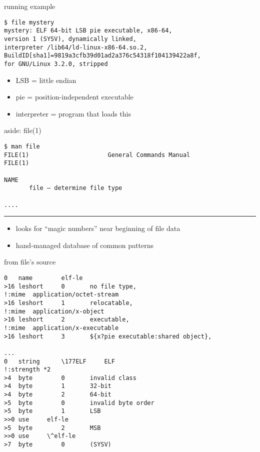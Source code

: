 \begin{frame}[fragile]{running example}
\begin{Verbatim}[fontsize=\small]
$ file mystery
mystery: ELF 64-bit LSB pie executable, x86-64,
version 1 (SYSV), dynamically linked,
interpreter /lib64/ld-linux-x86-64.so.2,
BuildID[sha1]=9819a3cfb39d01ad2a376c54318f104139422a8f,
for GNU/Linux 3.2.0, stripped
\end{Verbatim}
\begin{itemize}
\item LSB = little endian
\item pie = position-independent executable
\item interpreter = program that loads this
\end{itemize}
\end{frame}

\begin{frame}[fragile]{aside: file(1)}
\begin{Verbatim}[fontsize=\small]
$ man file
FILE(1)                      General Commands Manual                    FILE(1)

NAME
       file — determine file type

....
\end{Verbatim}
\hrule
\begin{itemize}
\item looks for ``magic numbers'' near beginning of file data
\item hand-managed database of common patterns
\end{itemize}
\end{frame}

\begin{frame}[fragile]{from file's source}
\begin{Verbatim}[fontsize=\scriptsize]
0   name        elf-le
>16 leshort     0       no file type,
!:mime  application/octet-stream
>16 leshort     1       relocatable,
!:mime  application/x-object
>16 leshort     2       executable,
!:mime  application/x-executable
>16 leshort     3       ${x?pie executable:shared object},

...
0   string      \177ELF     ELF
!:strength *2
>4  byte        0       invalid class
>4  byte        1       32-bit
>4  byte        2       64-bit
>5  byte        0       invalid byte order
>5  byte        1       LSB
>>0 use     elf-le
>5  byte        2       MSB
>>0 use     \^elf-le
>7  byte        0       (SYSV)
\end{Verbatim}
\end{frame}
